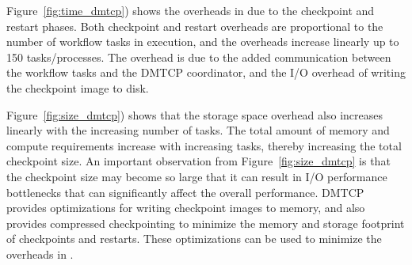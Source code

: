 Figure~\ref{fig:time_dmtcp}) shows the overheads in \systemname
due to the checkpoint and restart phases.  Both checkpoint and restart
overheads are proportional to the number of workflow tasks in
execution, and the overheads increase linearly up to 150
tasks/processes. The overhead is due to the added communication between the
workflow tasks and the DMTCP coordinator, and the I/O overhead of
writing the checkpoint image to disk.


Figure~\ref{fig:size_dmtcp}) shows that the storage space overhead
also increases linearly with the increasing number of tasks. 
The total amount of memory and compute requirements increase
with increasing tasks, thereby increasing the total checkpoint size.
An important observation from Figure~\ref{fig:size_dmtcp} is that the
checkpoint size may become so large that it can result in I/O performance
bottlenecks that can significantly affect the overall \systemname performance. 
DMTCP provides optimizations for writing checkpoint images to memory,
and also provides compressed checkpointing to minimize the memory and storage
footprint of checkpoints and restarts. These optimizations can be used to
minimize the overheads in \systemname. 



